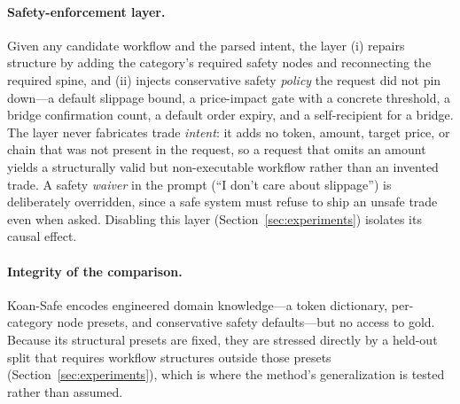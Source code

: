 \paragraph{Safety-enforcement layer.} Given any candidate workflow and the
parsed intent, the layer (i) repairs structure by adding the category's
required safety nodes and reconnecting the required spine, and (ii) injects
conservative safety \emph{policy} the request did not pin down---a default
slippage bound, a price-impact gate with a concrete threshold, a bridge
confirmation count, a default order expiry, and a self-recipient for a bridge.
The layer never fabricates trade \emph{intent}: it adds no token, amount,
target price, or chain that was not present in the request, so a request that
omits an amount yields a structurally valid but non-executable workflow rather
than an invented trade. A safety \emph{waiver} in the prompt (``I don't care
about slippage'') is deliberately overridden, since a safe system must refuse
to ship an unsafe trade even when asked. Disabling this layer
(Section~\ref{sec:experiments}) isolates its causal effect.

\paragraph{Integrity of the comparison.} Koan-Safe encodes engineered domain
knowledge---a token dictionary, per-category node presets, and conservative
safety defaults---but no access to gold. Because its structural presets are
fixed, they are stressed directly by a held-out split that requires workflow
structures outside those presets (Section~\ref{sec:experiments}), which is
where the method's generalization is tested rather than assumed.
